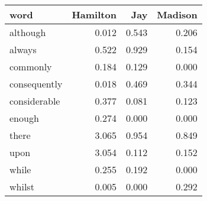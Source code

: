 \documentclass[]{book}
\theoremstyle{definition}
\theoremstyle{definition}
\theoremstyle{definition}
\theoremstyle{remark}
\begin{document}
\begin{tabular}{l|r|r|r}
\hline
word & Hamilton & Jay & Madison\\
\hline
although & 0.012 & 0.543 & 0.206\\
\hline
always & 0.522 & 0.929 & 0.154\\
\hline
commonly & 0.184 & 0.129 & 0.000\\
\hline
consequently & 0.018 & 0.469 & 0.344\\
\hline
considerable & 0.377 & 0.081 & 0.123\\
\hline
enough & 0.274 & 0.000 & 0.000\\
\hline
there & 3.065 & 0.954 & 0.849\\
\hline
upon & 3.054 & 0.112 & 0.152\\
\hline
while & 0.255 & 0.192 & 0.000\\
\hline
whilst & 0.005 & 0.000 & 0.292\\
\hline
\end{tabular}
\end{document}
